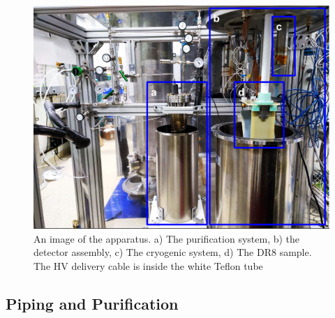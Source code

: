 \documentclass[a4paper,12pt]{article}
\newcommand{\DR}{DR8}
\begin{document}
\begin{figure}[ht]
\centerline{\includegraphics[width=0.85\linewidth]{full_sys.png}}

\caption{An image of the apparatus. a) The purification system, b) the detector assembly, c) The cryogenic system, d) The {\DR} sample. The HV delivery cable is inside the white Teflon tube}
\label{fig:full_sys}
\end{figure}

\subsection{Piping and Purification}
\label{sec:piping}
\end{document}
